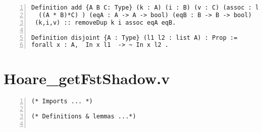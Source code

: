 \begin{appendices}
\begin{lstlisting}[xleftmargin=-.1\textwidth,
xrightmargin=-.1\textwidth,
mathescape=true,numbers=left]
Definition add {A B C: Type} (k : A) (i : B) (v : C) (assoc : list 
  ((A * B)*C) ) (eqA : A -> A -> bool) (eqB : B -> B -> bool)  :=
 (k,i,v) :: removeDup k i assoc eqA eqB.

Definition disjoint {A : Type} (l1 l2 : list A) : Prop := 
forall x : A,  In x l1  -> ~ In x l2 . 
\end{lstlisting}

\chapter{Hoare\_getFstShadow.v} \label{getFstFile}
\begin{lstlisting}[xleftmargin=-.1\textwidth,
xrightmargin=-.1\textwidth,
mathescape=true,numbers=left]
(* Imports ... *)

(* Definitions & lemmas ...*)


\end{lstlisting}
\end{appendices}
